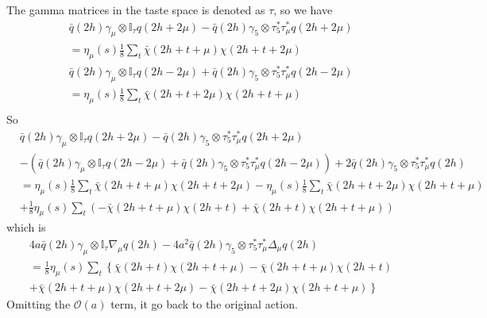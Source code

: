 The gamma matrices in the taste space is denoted as $\tau$, so we have
\begin{equation}
\begin{split}
&\bar{q}(2h)\gamma _{\mu}\otimes \mathbb{I}_{\tau} q(2h+2\mu) - \bar{q}(2h)\gamma _5\otimes \tau _5^*\tau _{\mu}^* q(2h+2\mu)\\
&=\eta _{\mu}(s)\frac{1}{8}\sum _{t} \bar{\chi}(2h+t+\mu)\chi (2h+t+2\mu)\\
&\bar{q}(2h)\gamma _{\mu}\otimes \mathbb{I}_{\tau} q(2h-2\mu) + \bar{q}(2h)\gamma _5\otimes \tau _5^*\tau _{\mu}^* q(2h-2\mu)\\
&=\eta _{\mu}(s)\frac{1}{8}\sum _{t} \bar{\chi}(2h+t+2\mu)\chi (2h+t+\mu)\\
\end{split}
\label{eq.staggeredquark2}
\end{equation}
So
\begin{equation}
\begin{split}
&\bar{q}(2h)\gamma _{\mu}\otimes \mathbb{I}_{\tau} q(2h+2\mu) - \bar{q}(2h)\gamma _5\otimes \tau _5^*\tau _{\mu}^* q(2h+2\mu)\\
&-\left(\bar{q}(2h)\gamma _{\mu}\otimes \mathbb{I}_{\tau} q(2h-2\mu) + \bar{q}(2h)\gamma _5\otimes \tau _5^*\tau _{\mu}^* q(2h-2\mu)\right)+2\bar{q}(2h)\gamma _5\otimes \tau _5^*\tau _{\mu}^* q(2h)\\
&=\eta _{\mu}(s)\frac{1}{8}\sum _{t} \bar{\chi}(2h+t+\mu)\chi (2h+t+2\mu)-\eta _{\mu}(s)\frac{1}{8}\sum _{t} \bar{\chi}(2h+t+2\mu)\chi (2h+t+\mu)\\
&+\frac{1}{8} \eta _{\mu}(s)\sum _{t} \left(-\bar{\chi}(2h+t+\mu)\chi (2h+t) +  \bar{\chi}(2h+t)\chi (2h+t+\mu)\right)
\end{split}
\label{eq.staggeredquark3}
\end{equation}
which is
\begin{equation}
\begin{split}
&4a\bar{q}(2h)\gamma _{\mu}\otimes \mathbb{I}_{\tau}\nabla _{\mu} q(2h) - 4a^2\bar{q}(2h)\gamma _5\otimes \tau _5^*\tau _{\mu}^* \Delta _{\mu}q(2h)\\
&=\frac{1}{8} \eta _{\mu}(s)\sum _{t} \left\{\bar{\chi}(2h+t)\chi (2h+t+\mu)-\bar{\chi}(2h+t+\mu)\chi (2h+t)\right.\\
&+\left.\bar{\chi}(2h+t+\mu)\chi (2h+t+2\mu)-\bar{\chi}(2h+t+2\mu)\chi (2h+t+\mu)\right\}
\end{split}
\label{eq.staggeredquark4}
\end{equation}
Omitting the $\mathcal{O}(a)$ term, it go back to the original action.

